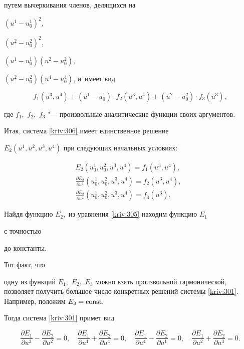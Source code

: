 путем вычеркивания членов,  делящихся на 

$(u^{1}-u_{0}^{1})^{2},$ 

$(u^{2}-u_{0}^{2})^{2},$ 

$(u^{1}-u_{0}^{1}) (u^{2}-u_{0}^{2}),$ 

$( u^{2}-u_{0}^{2}) (u^{4}-u_{0}^{4}) $, и~имеет вид

\begin{equation*}

f_{1} ( u^{3},u^{4} ) + ( u^{1}-u_{0}^{1} ) \cdot f_{2} ( u^{3},u^{4}) +

( u^{2}-u_{0}^{2}) \cdot f_{3}( u^{3} ) ,

\end{equation*}

где $f_{1},$ $f_{2},$ $f_{3}$ "--- произвольные аналитические функции своих аргументов. 

Итак,  система \eqref{kriv:306} имеет  единственное решение 

$E_{2}( u^{1},u^{2},u^{3},u^{4}) $ при следующих начальных условиях:

\begin{gather*}

E_{2} ( u_{0}^{1},u_{0}^{2},u^{3},u^{4} ) =f_{1} (u^{3},u^{4}) ,~~~ \\ 

\frac{\partial E_{2}}{\partial u^{1}} ( u_{0}^{1},u_{0}^{2},u^{3},u^{4} ) =f_{2}( u^{3},u^{4} ), \\ 

\frac{\partial E_{2}}{\partial u^{2}} (u_{0}^{1},u_{0}^{2},u^{3},u^{4}) =f_{3}( u^{3} ) .~~~~

\end{gather*}

Найдя функцию $E_{2},$ из уравнения \eqref{kriv:305} находим функцию $E_{1}$ 

с точностью 

до константы.



Тот факт,  что 

одну из функций $E_{1},$ $E_{2},$ $E_{3}$ можно взять произвольной гармонической, позволяет получить большое число конкретных решений системы \eqref{kriv:301}. Например, положим $E_{3}=\rm const.$ 

Тогда система \eqref{kriv:301} примет вид

\begin{equation}

\frac{\partial E_{1}}{\partial u^{3}}-\frac{\partial E_{2}}{\partial u^{2}}=0,\quad \frac{\partial E_{1}}{\partial u^{1}}+\frac{\partial E_{2}}{\partial u^{4}}=0,\quad \frac{\partial E_{1}}{\partial u^{4}}-\frac{\partial E_{2}}{\partial u^{1}}=0,\quad \frac{\partial E_{1}}{\partial u^{2}}+\frac{\partial E_{2}}{\partial u^{3}}=0.  \label{kriv:307}

\end{equation}



